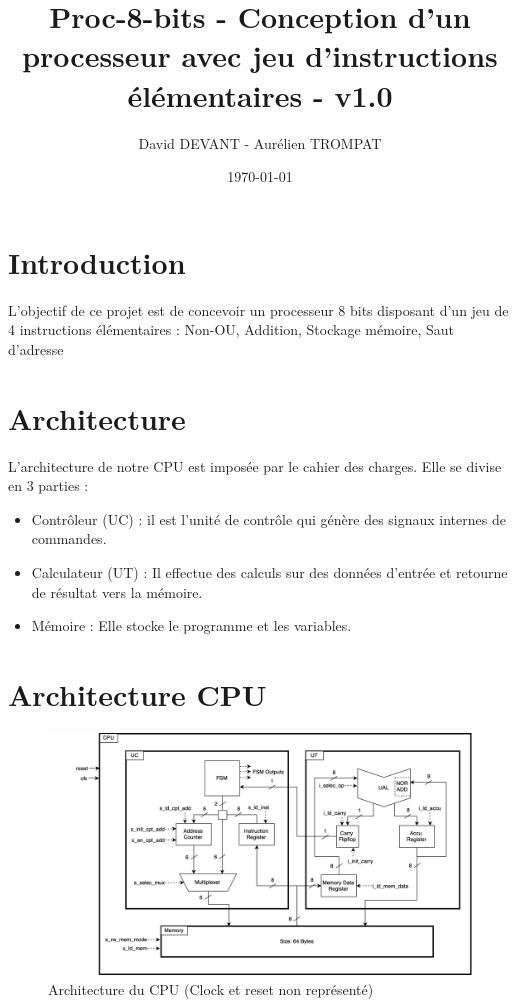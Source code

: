 \documentclass{article}
\title{Proc-8-bits - Conception d'un processeur avec jeu d'instructions élémentaires - v1.0}
\author{David DEVANT - Aurélien TROMPAT}
\date{\today}
\begin{document}
    \maketitle

    \tableofcontents

    \section*{Introduction}
    \par L'objectif de ce projet est de concevoir un processeur 8 bits disposant d'un jeu de 4 instructions élémentaires : Non-OU, Addition, Stockage mémoire, Saut d'adresse  
    \newpage

    \section{Architecture}
    \par L'architecture de notre CPU est imposée par le cahier des charges. Elle se divise en 3 parties :
    \begin{itemize}\renewcommand{\labelitemi}{$\bullet$} 
        \item Contrôleur (UC) : il est l'unité de contrôle qui génère des signaux internes de commandes. 
        \item Calculateur (UT) : Il effectue des calculs sur des données d'entrée et retourne de résultat vers la mémoire.
        \item Mémoire : Elle stocke le programme et les variables.
    \end{itemize}

    \section{Architecture CPU}
    \begin{figure}[h]
        \centering
        \includegraphics[width=\textwidth]{../doc/VHDL_Diagram.png}
        \caption{Architecture du CPU (Clock et reset non représenté)}
        \label{fig:vhdl_diagram}
    \end{figure}
\end{document}
